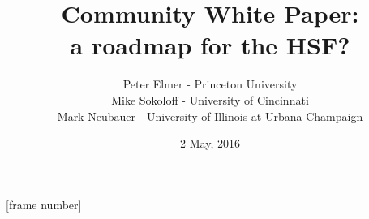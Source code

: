 \documentclass{beamer}
\title{Community White Paper: \\ a roadmap for the HSF?}
\author{Peter Elmer - Princeton University \\
        Mike Sokoloff - University of Cincinnati \\
        Mark Neubauer - University of Illinois at Urbana-Champaign}
\date{2 May, 2016}
\begin{document}
\maketitle

%
%

[frame number]














\end{document}
